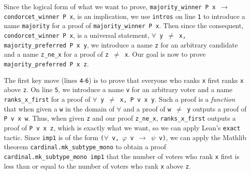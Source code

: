 \documentclass[runningheads]{llncs}
\begin{document}
Since the logical form of what we want to prove, \texttt{majority\_winner P x $\to$ condorcet\_winner P x}, is an implication, we use \texttt{intros} on line \texttt{1} to introduce a name \texttt{majority} for a proof of \texttt{majority\_winner P x}. Then since the consequent, \texttt{condorcet\_winner P x}, is a universal statement, \texttt{$\forall$ y $\neq$ x, majority\_preferred  P x~y}, we introduce a name \texttt{z} for an arbitrary candidate and a name \texttt{z\_ne\_x} for a proof of \texttt{z $\neq$ x}. Our goal is now to prove \texttt{majority\_preferred P x z}. %

The first key move (lines \texttt{4}-\texttt{6}) is to prove that everyone who ranks \texttt{x} first ranks \texttt{x} above \texttt{z}. On line \texttt{5}, we introduce a name \texttt{v} for an arbitrary voter and a name \texttt{ranks\_x\_first} for a proof of  \texttt{$\forall$ y $\neq$ x, P v x y}. Such a proof is a \textit{function} that when given a \texttt{w} in the domain of $\forall$ and a proof of \texttt{w $\neq$ y} outputs a proof of \texttt{P~v~x~w}. Thus, when given \texttt{z} and our proof \texttt{z\_ne\_x},  \texttt{ranks\_x\_first} outputs a proof of \texttt{P v x z}, which is exactly what we want, so we can apply Lean's \texttt{exact} tactic. Since \texttt{imp1} is of the form \texttt{($\forall$ v, $\varphi$ v $\to$ $\psi$ v)}, we can apply the Mathlib theorem \texttt{cardinal.mk\_subtype\_mono} to obtain a proof \texttt{cardinal.mk\_subtype\_mono imp1} that the number of voters who rank \texttt{x} first is less than or equal to the number of voters who rank \texttt{x} above \texttt{z}.%
\end{document}
